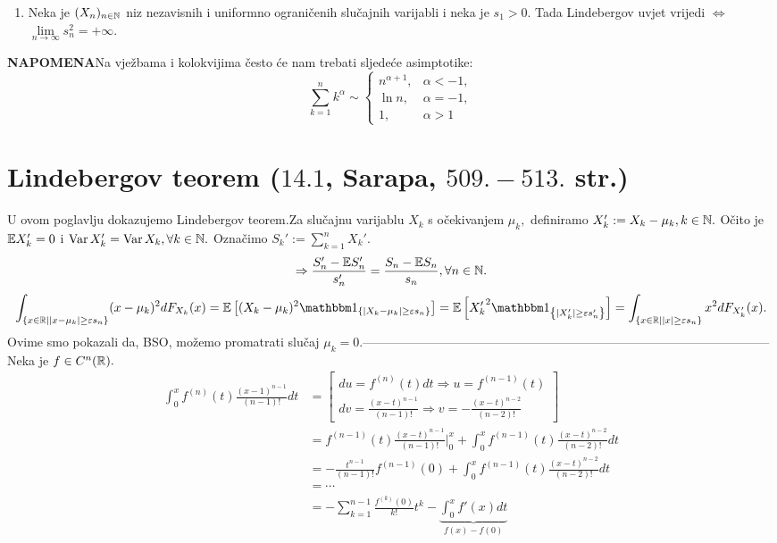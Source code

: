 \documentclass{article}
\newcommand{\Var}{\operatorname{Var}}
\begin{document}
\begin{enumerate}
    \item[\ding{113}] Neka je \((X_n)_{n\in\Bbb N}\) niz nezavisnih i uniformno ograničenih slučajnih varijabli i neka je \(s_1>0.\) Tada Lindebergov uvjet vrijedi \(\Leftrightarrow\) \(\lim\limits_{n\to\infty}s_n^2=+\infty.\)
\end{enumerate}
\textbf{NAPOMENA}\newline Na vježbama i kolokvijima često će nam trebati sljedeće asimptotike: \[\boxed{\sum_{k=1}^nk^\alpha\sim\begin{cases}n^{\alpha+1},& \alpha<-1,\\\ln n,&\alpha=-1,\\1,&\alpha>1\end{cases}}\]
\newpage
\section{Lindebergov teorem (\textsection \(14.1\), Sarapa, \(509.-513.\) str.)}
U ovom poglavlju dokazujemo Lindebergov teorem.\newline\newline Za slučajnu varijablu \(X_k\) s očekivanjem \(\mu_k,\) definiramo \(X_k':=X_k-\mu_k,k\in\Bbb N.\)  Očito je \(\Bbb EX_k'=0\) i \(\Var X_k'=\Var X_k,\forall k\in\Bbb N.\) Označimo \(S_k':=\sum_{k=1}^nX_k'.\) \[\Rightarrow\frac{S_n'-\Bbb ES_n'}{s_n'}=\frac{S_n-\Bbb ES_n}{s_n},\forall n\in\Bbb N.\] \[\int_{\left\{x\in\Bbb R\mid |x-\mu_k|\ge\varepsilon s_n\right\}}(x-\mu_k)^2dF_{X_k}(x)=\Bbb E\left[(X_k-\mu_k)^2\mathbbm 1_{\left\{|X_k-\mu_k|\ge\varepsilon s_n\right\}}\right]=\Bbb E\left[{X_k'}^2\mathbbm 1_{\left\{|X_k'|\ge\varepsilon s_n'\right\}}\right]=\int_{\left\{x\in\Bbb R\mid |x|\ge\varepsilon s_n\right\}}x^2dF_{X_k'}(x).\] Ovime smo pokazali da, BSO, možemo promatrati slučaj \(\mu_k=0.\)\newline\newline--------------------------------------------------------------------------------------------------\newline\newline Neka je \(f\in C^n(\Bbb R).\) \[\begin{aligned}\int_0^xf^{(n)}(t)\frac{(x-1)^{n-1}}{(n-1)!}dt&=\begin{bmatrix}du=f^{(n)}(t)dt\Rightarrow u=f^{(n-1)}(t)\\dv=\frac{(x-t)^{n-1}}{(n-1)!}\Rightarrow v=-\frac{(x-t)^{n-2}}{(n-2)!}\end{bmatrix}\\&=f^{(n-1)}(t)\frac{(x-t)^{n-1}}{(n-1)!}\big|_0^x+\int_0^xf^{(n-1)}(t)\frac{(x-t)^{n-2}}{(n-2)!}dt\\&=-\frac{t^{n-1}}{(n-1)!}f^{(n-1)}(0)+\int_0^xf^{(n-1)}(t)\frac{(x-t)^{n-2}}{(n-2)!}dt\\&=\cdots\\&=-\sum_{k=1}^{n-1}\frac{f^{(k)}(0)}{k!}t^k-\underbrace{\int_0^xf'(x)dt}_{f(x)-f(0)}\end{aligned}\]
\end{document}
